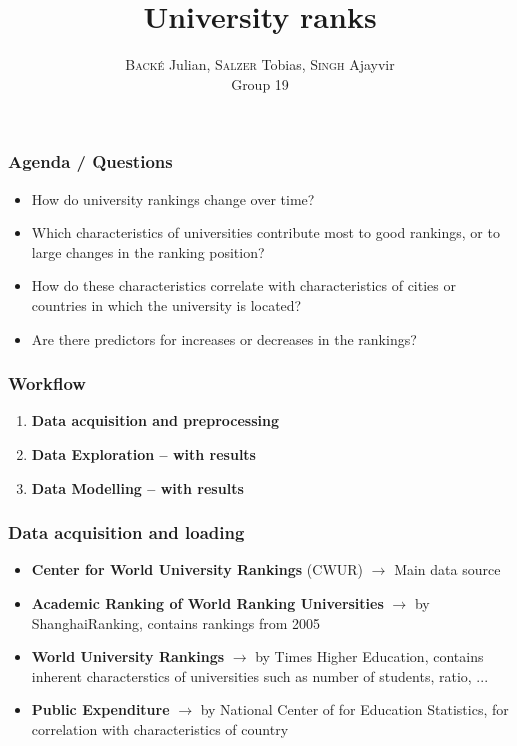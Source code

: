 \documentclass[mathserif,notheorems,11pt]{beamer}
\title{\textbf{University ranks}}
\author{\textsc{Back\'{e}} Julian, \textsc{Salzer} Tobias, \textsc{Singh} Ajayvir\\
Group 19}
\date{}
\begin{document}
\maketitle
\linespread{1.2}

\begin{frame} 
\frametitle{Agenda / Questions}
\begin{itemize}
	\item How do university rankings change over time? 
	
	\item Which characteristics of universities contribute most to good rankings, or to large changes in the ranking position? 
	
	\item How do these characteristics correlate with characteristics of cities or countries in which the university is
	located? 
	
	\item Are there predictors for increases or decreases in the rankings?
\end{itemize}

\end{frame}

\begin{frame} 
\frametitle{Workflow}


\begin{enumerate}
\item \textbf{Data acquisition and preprocessing}

\item \textbf{Data Exploration -- with results}

\item \textbf{Data Modelling -- with results}
\end{enumerate}
\end{frame}

\begin{frame} 
\frametitle{Data acquisition and loading}
\begin{itemize}
\item \textbf{Center for World University Rankings} (CWUR) $\rightarrow$ Main data source
\item \textbf{Academic Ranking of World Ranking Universities} $\rightarrow$ by ShanghaiRanking, contains rankings from 2005
\item \textbf{World University Rankings } $\rightarrow$ by Times Higher Education, contains inherent characterstics of universities such as number of students, ratio, ...
\item \textbf{Public Expenditure} $\rightarrow$ by National Center of for Education Statistics, for correlation with characteristics of country

\end{itemize}

\end{frame}
\end{document}
